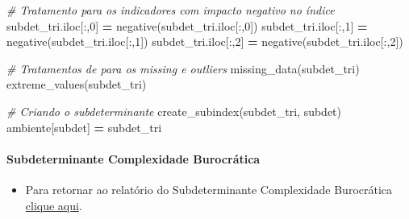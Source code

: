 \documentclass[
  12,
  dvipsnames]{article}
\newenvironment{Shaded}{\begin{snugshade}}{\end{snugshade}}
\newcommand{\CommentTok}[1]{\textcolor[rgb]{0.56,0.35,0.01}{\textit{#1}}}
\newcommand{\DecValTok}[1]{\textcolor[rgb]{0.00,0.00,0.81}{#1}}
\newcommand{\NormalTok}[1]{#1}
\newcommand{\OperatorTok}[1]{\textcolor[rgb]{0.81,0.36,0.00}{\textbf{#1}}}
\providecommand{\tightlist}{%
  \setlength{\itemsep}{0pt}\setlength{\parskip}{0pt}}
\begin{document}
\begin{Shaded}
\begin{Highlighting}[]
\CommentTok{\# Tratamento para os indicadores com impacto negativo no índice}
\NormalTok{subdet\_tri.iloc[:,}\DecValTok{0}\NormalTok{] }\OperatorTok{=}\NormalTok{ negative(subdet\_tri.iloc[:,}\DecValTok{0}\NormalTok{])}
\NormalTok{subdet\_tri.iloc[:,}\DecValTok{1}\NormalTok{] }\OperatorTok{=}\NormalTok{ negative(subdet\_tri.iloc[:,}\DecValTok{1}\NormalTok{])}
\NormalTok{subdet\_tri.iloc[:,}\DecValTok{2}\NormalTok{] }\OperatorTok{=}\NormalTok{ negative(subdet\_tri.iloc[:,}\DecValTok{2}\NormalTok{])}

\CommentTok{\# Tratamentos de para os missing e outliers}
\NormalTok{missing\_data(subdet\_tri)}
\NormalTok{extreme\_values(subdet\_tri)}

\CommentTok{\# Criando o subdeterminante}
\NormalTok{create\_subindex(subdet\_tri, subdet)}
\NormalTok{ambiente[subdet] }\OperatorTok{=}\NormalTok{ subdet\_tri}
\end{Highlighting}
\end{Shaded}

\hypertarget{script_2.1.3}{%
\paragraph*{Subdeterminante Complexidade
Burocrática}\label{script_2.1.3}}

\begin{itemize}
\tightlist
\item
  Para retornar ao relatório do Subdeterminante Complexidade Burocrática
  \protect\hyperlink{subdet_complexidade}{clique aqui}.
\end{itemize}
\end{document}
